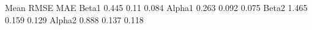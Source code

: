 Mean RMSE MAE
Beta1 0.445 0.11 0.084
Alpha1 0.263 0.092 0.075
Beta2 1.465 0.159 0.129
Alpha2 0.888 0.137 0.118
